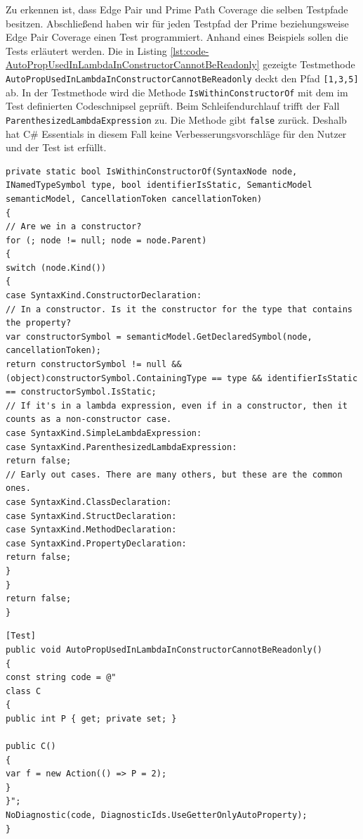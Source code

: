 \vspace{1ex}
Zu erkennen ist, dass Edge Pair und Prime Path Coverage die selben Testpfade besitzen. Abschließend haben wir für jeden Testpfad der Prime beziehungsweise Edge Pair Coverage einen Test programmiert. Anhand eines Beispiels sollen die Tests erläutert werden. Die in Listing \ref{lst:code-AutoPropUsedInLambdaInConstructorCannotBeReadonly} gezeigte Testmethode \texttt{AutoPropUsedInLambdaInConstructorCannotBeReadonly} deckt den Pfad \texttt{[1,3,5]} ab. In der Testmethode wird die Methode \texttt{IsWithinConstructorOf} mit dem im Test definierten Codeschnipsel geprüft. Beim Schleifendurchlauf trifft der Fall \texttt{ParenthesizedLambdaExpression} zu. Die Methode gibt \texttt{false} zurück. Deshalb hat C\# Essentials in diesem Fall keine Verbesserungsvorschläge für den Nutzer und der Test ist erfüllt.
\begin{lstlisting}[caption={Mehtode \texttt{IsWithinConstructorOf}},
label=lst:code-IsWithinConstructorOf]
private static bool IsWithinConstructorOf(SyntaxNode node, INamedTypeSymbol type, bool identifierIsStatic, SemanticModel semanticModel, CancellationToken cancellationToken)
{
// Are we in a constructor?
for (; node != null; node = node.Parent)
{
switch (node.Kind())
{
case SyntaxKind.ConstructorDeclaration:
// In a constructor. Is it the constructor for the type that contains the property?
var constructorSymbol = semanticModel.GetDeclaredSymbol(node, cancellationToken);
return constructorSymbol != null && (object)constructorSymbol.ContainingType == type && identifierIsStatic == constructorSymbol.IsStatic;
// If it's in a lambda expression, even if in a constructor, then it counts as a non-constructor case.
case SyntaxKind.SimpleLambdaExpression:
case SyntaxKind.ParenthesizedLambdaExpression:
return false;
// Early out cases. There are many others, but these are the common ones.
case SyntaxKind.ClassDeclaration:
case SyntaxKind.StructDeclaration:
case SyntaxKind.MethodDeclaration:
case SyntaxKind.PropertyDeclaration:
return false;
}
}
return false;
}
\end{lstlisting}
\begin{lstlisting}[caption={Mehtode \texttt{AutoPropUsedInLambdaInConstructorCannotBeReadonly}},
label=lst:code-AutoPropUsedInLambdaInConstructorCannotBeReadonly]
[Test]
public void AutoPropUsedInLambdaInConstructorCannotBeReadonly()
{
const string code = @"
class C
{
public int P { get; private set; }

public C()
{
var f = new Action(() => P = 2);
}
}";
NoDiagnostic(code, DiagnosticIds.UseGetterOnlyAutoProperty);
}
\end{lstlisting}
